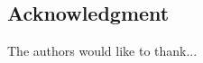 \documentclass[conference]{IEEEtran}
\begin{document}


\subsection*{Acknowledgment}\label{sec:acknowledgment}
The authors would like to thank...



\end{document}
